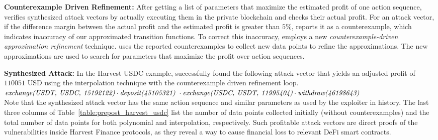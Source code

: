 \noindent \textbf{Counterexample Driven Refinement: } After getting a list of parameters that maximize the estimated profit of one
action sequence, {\name} verifies synthesized attack vectors by actually
executing them in the private blockchain and checks their actual profit. For an
attack vector, if the difference margin between the actual profit and the
estimated profit is greater than $5\%$, {\name} reports it as a counterexample,
which indicates inaccuracy of our approximated transition functions. To correct
this inaccuracy, {\name} employs a new \textit{counterexample-driven
approximation refinement} technique. {\name} uses the reported counterexamples
to collect new data points to refine the approximations. The new approximations
are used to search for parameters that maximize the profit over action
sequences.

\noindent \textbf{Synthesized Attack:} In the Harvest USDC example, {\name}
successfully found the following attack vector that yields an adjusted profit
of $110051$ USD using the interpolation technique with the counterexample
driven refinement loop. \\ 

$\emph{exchange(USDT, USDC, 15192122)} \cdot
\emph{deposit(45105321)}\ \cdot \emph{exchange(USDC, USDT, 11995404)} \cdot
\emph{withdraw(46198643)}$\\

Note that the synthesized attack vector has the same action sequence and
similar parameters as used by the exploiter in history. The last three columns
of Table~\ref{table:prepost_harvest_usdc} list the number of data points
collected initially (without counterexamples) and the total number of data
points for both polynomial and interpolation, respectively.  Such profitable attack vectors are direct proofs of the vulnerabilities inside Harvest Finance protocols, as they reveal a way to cause financial loss to relevant DeFi smart contracts. 

